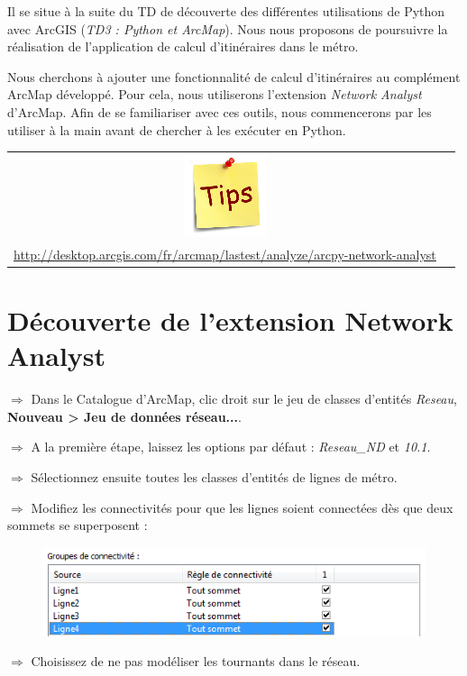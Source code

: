 \documentclass[11pt]{article}
\newcommand{\action}{$\Rightarrow$ }
\newenvironment{note}{%
	\begin{tabular}[t t]{c c}
		\includegraphics{img/tips.png}
		 &
		\begin{minipage}[c]{0.9\linewidth}
			\begin{sffamily}
}{%
			\end{sffamily}
		\end{minipage}
	\end{tabular}
}
\begin{document}
Il se situe à la suite du TD de découverte des différentes utilisations de Python avec ArcGIS (\textit{TD3 : Python et ArcMap}). Nous nous proposons de poursuivre la réalisation de l'application de calcul d'itinéraires dans le métro.

Nous cherchons à ajouter une fonctionnalité de calcul d'itinéraires au complément ArcMap développé. Pour cela, nous utiliserons l'extension \textit{Network Analyst} d'ArcMap. Afin de se familiariser avec ces outils, nous commencerons par les utiliser à la main avant de chercher à les exécuter en Python.

\begin{note}
Ressource utile :
\begin{itemize}
	\item Doc Network Analyst : \\
	\url{http://desktop.arcgis.com/fr/arcmap/lastest/analyze/arcpy-network-analyst}
\end{itemize}
\end{note}

\section{Découverte de l'extension Network Analyst}

\action Dans le Catalogue d'ArcMap, clic droit sur le jeu de classes d'entités \textit{Reseau}, \textbf{Nouveau > Jeu de données réseau...}.

\action A la première étape, laissez les options par défaut : \textit{Reseau\_ND} et \textit{10.1}.

\action Sélectionnez ensuite toutes les classes d'entités de lignes de métro.

\action Modifiez les connectivités pour que les lignes soient connectées dès que deux sommets se superposent :
\begin{figure}[H]
	\center \includegraphics{img/td3b/network_analyst-8.png} \\
\end{figure}

\action Choisissez de ne pas modéliser les tournants dans le réseau.
\end{document}
